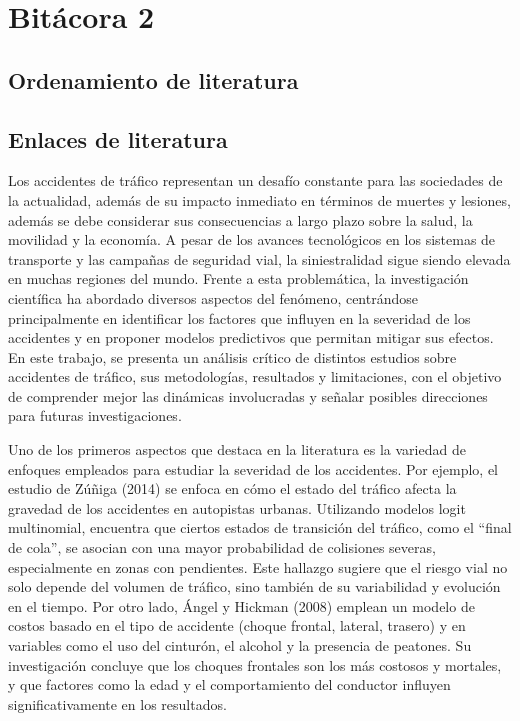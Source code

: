 \documentclass{book}
\begin{document}
\chapter*{Bitácora 2}
\section{Ordenamiento de literatura}

\section{Enlaces de literatura}



Los accidentes de tráfico representan un desafío constante para las sociedades de la actualidad, además de su impacto inmediato en términos de muertes y lesiones, además se debe considerar sus consecuencias a largo plazo sobre la salud, la movilidad y la economía. A pesar de los avances tecnológicos en los sistemas de transporte y las campañas de seguridad vial, la siniestralidad sigue siendo elevada en muchas regiones del mundo. Frente a esta problemática, la investigación científica ha abordado diversos aspectos del fenómeno, centrándose principalmente en identificar los factores que influyen en la severidad de los accidentes y en proponer modelos predictivos que permitan mitigar sus efectos. En este trabajo, se presenta un análisis crítico de distintos estudios sobre accidentes de tráfico, sus metodologías, resultados y limitaciones, con el objetivo de comprender mejor las dinámicas involucradas y señalar posibles direcciones para futuras investigaciones.

Uno de los primeros aspectos que destaca en la literatura es la variedad de enfoques empleados para estudiar la severidad de los accidentes. Por ejemplo, el estudio de Zúñiga (2014) se enfoca en cómo el estado del tráfico afecta la gravedad de los accidentes en autopistas urbanas. Utilizando modelos logit multinomial, encuentra que ciertos estados de transición del tráfico, como el ``final de cola'', se asocian con una mayor probabilidad de colisiones severas, especialmente en zonas con pendientes. Este hallazgo sugiere que el riesgo vial no solo depende del volumen de tráfico, sino también de su variabilidad y evolución en el tiempo. Por otro lado, Ángel y Hickman (2008) emplean un modelo de costos basado en el tipo de accidente (choque frontal, lateral, trasero) y en variables como el uso del cinturón, el alcohol y la presencia de peatones. Su investigación concluye que los choques frontales son los más costosos y mortales, y que factores como la edad y el comportamiento del conductor influyen significativamente en los resultados.
\end{document}

